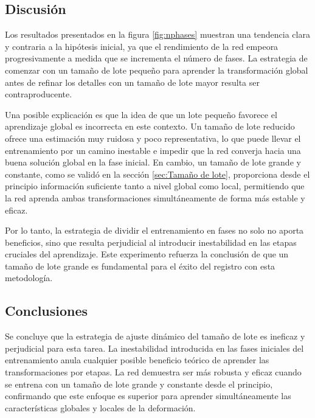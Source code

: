 \subsection{Discusión}\label{subsec:Discusion-phases}

Los resultados presentados en la figura \ref{fig:nphases} muestran una tendencia clara y contraria a la hipótesis inicial, ya que el rendimiento de la red empeora progresivamente a medida que se incrementa el número de fases. La estrategia de comenzar con un tamaño de lote pequeño para aprender la transformación global antes de refinar los detalles con un tamaño de lote mayor resulta ser contraproducente.

Una posible explicación es que la idea de que un lote pequeño favorece el aprendizaje global es incorrecta en este contexto. Un tamaño de lote reducido ofrece una estimación muy ruidosa y poco representativa, lo que puede llevar el entrenamiento por un camino inestable e impedir que la red converja hacia una buena solución global en la fase inicial. En cambio, un tamaño de lote grande y constante, como se validó en la sección \ref{sec:Tamaño de lote}, proporciona desde el principio información suficiente tanto a nivel global como local, permitiendo que la red aprenda ambas transformaciones simultáneamente de forma más estable y eficaz.

Por lo tanto, la estrategia de dividir el entrenamiento en fases no solo no aporta beneficios, sino que resulta perjudicial al introducir inestabilidad en las etapas cruciales del aprendizaje. Este experimento refuerza la conclusión de que un tamaño de lote grande es fundamental para el éxito del registro con esta metodología.

\subsection{Conclusiones}
\label{subsec:Conclusions-phases}

Se concluye que la estrategia de ajuste dinámico del tamaño de lote es ineficaz y perjudicial para esta tarea. La inestabilidad introducida en las fases iniciales del entrenamiento anula cualquier posible beneficio teórico de aprender las transformaciones por etapas. La red demuestra ser más robusta y eficaz cuando se entrena con un tamaño de lote grande y constante desde el principio, confirmando que este enfoque es superior para aprender simultáneamente las características globales y locales de la deformación.


